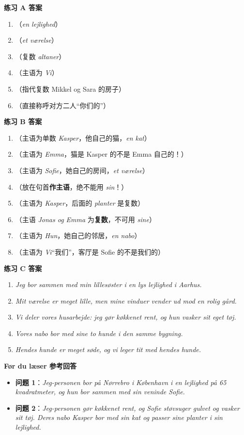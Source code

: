 \begin{answerbox}
\textbf{练习 A 答案}
\begin{enumerate}
  \item {}（\textit{en lejlighed}）
  \item {}（\textit{et værelse}）
  \item {}（复数 \textit{altaner}）
  \item {}（主语为 \textit{Vi}）
  \item {}（指代复数 Mikkel og Sara 的房子）
  \item {}（直接称呼对方二人“你们的”）
\end{enumerate}

\textbf{练习 B 答案}
\begin{enumerate}
  \item {}（主语为单数 \textit{Kasper}，他自己的猫，\textit{en kat}）
  \item {}（主语为 \textit{Emma}，猫是 Kasper 的不是 Emma 自己的！）
  \item {}（主语为 \textit{Sofie}，她自己的房间，\textit{et værelse}）
  \item {}（放在句首\textbf{作主语}，绝不能用 \textit{sin}！）
  \item {}（主语为 \textit{Kasper}，后面的 \textit{planter} 是复数）
  \item {}（主语 \textit{Jonas og Emma} 为\textbf{复数}，不可用 \textit{sine}）
  \item {}（主语为 \textit{Hun}，她自己的邻居，\textit{en nabo}）
  \item {}（主语为 \textit{Vi}“我们”，客厅是 Sofie 的不是我们的）
\end{enumerate}

\textbf{练习 C 答案}
\begin{enumerate}
  \item \textit{Jeg bor sammen med min lillesøster i en lys lejlighed i Aarhus.}
  \item \textit{Mit værelse er meget lille, men mine vinduer vender ud mod en rolig gård.}
  \item \textit{Vi deler vores husarbejde: jeg gør køkkenet rent, og hun vasker sit eget tøj.}
  \item \textit{Vores nabo bor med sine to hunde i den samme bygning.}
  \item \textit{Hendes hunde er meget søde, og vi leger tit med hendes hunde.}
\end{enumerate}

\textbf{Før du læser 参考回答}
\begin{itemize}
  \item \textbf{问题 1}：\textit{Jeg-personen bor på Nørrebro i København i en lejlighed på 65 kvadratmeter, og hun bor sammen med sin veninde Sofie.}
  \item \textbf{问题 2}：\textit{Jeg-personen gør køkkenet rent, og Sofie støvsuger gulvet og vasker sit tøj. Deres nabo Kasper bor med sin kat og passer sine planter i sin lejlighed.}
\end{itemize}
\end{answerbox}
